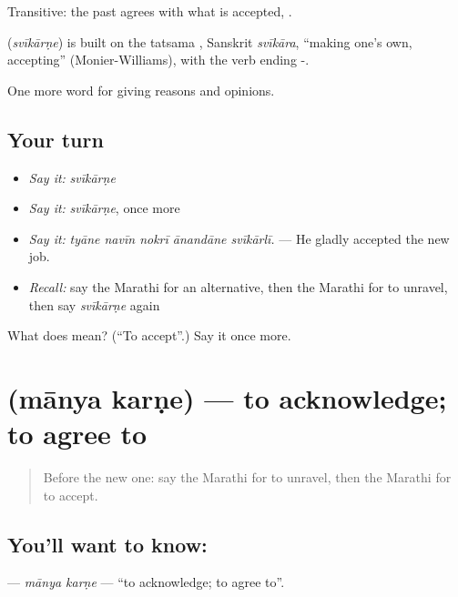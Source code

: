 Transitive: the past agrees with what is accepted,  .

\begin{cousinweb}
\textbf{} (\emph{svīkārṇe}) is built on the tatsama , Sanskrit \emph{svīkāra}, \textquotedblleft{}making one's own, accepting\textquotedblright{} (Monier-Williams), with the verb ending -.
\end{cousinweb}

\begin{grammarlens}[title={What you've built}]
One more word for giving reasons and opinions.
\end{grammarlens}

\subsection*{Your turn}
\begin{itemize}
\raggedright
  \item \emph{Say it:} \emph{svīkārṇe}
  \item \emph{Say it:} \emph{svīkārṇe}, once more
  \item \emph{Say it:} \emph{tyāne navīn nokrī ānandāne svīkārlī.} — He gladly accepted the new job.
  \item \emph{Recall:} say the Marathi for an alternative, then the Marathi for to unravel, then say \emph{svīkārṇe} again
\end{itemize}

\begin{tcolorbox}[breakable,colback=teal!4,colframe=teal!35!black,title={Before you move on}]
What does  mean? (\textquotedblleft{}To accept\textquotedblright{}.) Say it once more.
\end{tcolorbox}
\section[\texorpdfstring{\mr{मान्य} \mr{करणे} (mānya karṇe)}{मान्य करणे (mānya karṇe)}]{  (mānya karṇe) — to acknowledge; to agree to}

\label{lesson:MR-C350-manya-karne}



\begin{quote}
Before the new one: say the Marathi for to unravel, then the Marathi for to accept.
\end{quote}

\subsection*{You'll want to know:  }
\textbf{ } — \emph{mānya karṇe} — \textquotedblleft{}to acknowledge; to agree to\textquotedblright{}.

